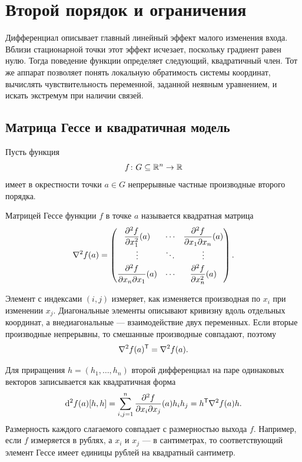 \section{Второй порядок и ограничения}
\label{sec:second-order-implicit-constrained}

Дифференциал описывает главный линейный эффект малого изменения входа. Вблизи стационарной точки этот эффект исчезает, поскольку градиент равен нулю. Тогда поведение функции определяет следующий, квадратичный член. Тот же аппарат позволяет понять локальную обратимость системы координат, вычислять чувствительность переменной, заданной неявным уравнением, и искать экстремум при наличии связей.

\subsection{Матрица Гессе и квадратичная модель}

Пусть функция
\[
f\colon G\subseteq\mathbb{R}^n\to\mathbb{R}
\]
имеет в окрестности точки \(a\in G\) непрерывные частные производные второго порядка.

\begin{definition}
Матрицей Гессе функции \(f\) в точке \(a\) называется квадратная матрица
\[
\nabla^{2}f(a)
=
\begin{pmatrix}
\dfrac{\partial^2 f}{\partial x_1^2}(a)
& \cdots &
\dfrac{\partial^2 f}{\partial x_1\partial x_n}(a)\\[1.1ex]
\vdots & \ddots & \vdots\\[0.6ex]
\dfrac{\partial^2 f}{\partial x_n\partial x_1}(a)
& \cdots &
\dfrac{\partial^2 f}{\partial x_n^2}(a)
\end{pmatrix}.
\]
\end{definition}

Элемент с индексами \((i,j)\) измеряет, как изменяется производная по \(x_i\) при изменении \(x_j\). Диагональные элементы описывают кривизну вдоль отдельных координат, а внедиагональные --- взаимодействие двух переменных. Если вторые производные непрерывны, то смешанные производные совпадают, поэтому
\[
\nabla^{2}f(a)^{\mathsf{T}}=\nabla^{2}f(a).
\]

Для приращения \(h=(h_1,\dots,h_n)\) второй дифференциал на паре одинаковых векторов записывается как квадратичная форма
\[
\mathop{}\!\mathrm{d}^2 f(a)[h,h]
=
\sum_{i,j=1}^n
\frac{\partial^2 f}{\partial x_i\partial x_j}(a)h_i h_j
=
h^{\mathsf{T}}\nabla^{2}f(a)h.
\]
Размерность каждого слагаемого совпадает с размерностью выхода \(f\). Например, если \(f\) измеряется в рублях, а \(x_i\) и \(x_j\) --- в сантиметрах, то соответствующий элемент Гессе имеет единицы рублей на квадратный сантиметр.

